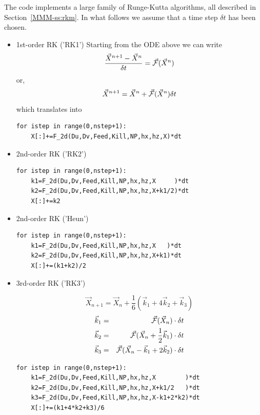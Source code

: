 The code implements a large family of Runge-Kutta algorithms, all described in 
Section~\ref{MMM-ss:rkm}.
In what follows we assume that a time step $\delta t$ has been chosen. 

\begin{itemize}

\item 1st-order RK ('RK1')
Starting from the ODE above we can write
\[
\frac{\vec{X}^{n+1} -\vec{X}^{n} }{\delta t} = \vec{\cal F} (\vec{X}^n)
\]
or, 
\[
\vec{X}^{n+1}
=
\vec{X}^{n} + \vec{\cal F} (\vec{X}^n) \delta t
\]
which translates into
\begin{lstlisting}
for istep in range(0,nstep+1):
    X[:]+=F_2d(Du,Dv,Feed,Kill,NP,hx,hz,X)*dt
\end{lstlisting}

\item 2nd-order RK ('RK2')
\begin{lstlisting}
for istep in range(0,nstep+1):
    k1=F_2d(Du,Dv,Feed,Kill,NP,hx,hz,X     )*dt
    k2=F_2d(Du,Dv,Feed,Kill,NP,hx,hz,X+k1/2)*dt
    X[:]+=k2
\end{lstlisting}

\item 2nd-order RK ('Heun')

\begin{lstlisting}
for istep in range(0,nstep+1):
    k1=F_2d(Du,Dv,Feed,Kill,NP,hx,hz,X   )*dt
    k2=F_2d(Du,Dv,Feed,Kill,NP,hx,hz,X+k1)*dt
    X[:]+=(k1+k2)/2
\end{lstlisting}



\item 3rd-order RK ('RK3')

\[
\vec{X}_{n+1} = \vec{X}_n + 
\frac{1}{6}\left(\vec{k}_1 + 4\vec{k}_2 + \vec{k}_3 \right)
\]
\begin{eqnarray}
\vec{k}_1 &=& \vec{\cal F}(\vec{X}_n) \cdot \delta t\nonumber\\
\vec{k}_2 &=& \vec{\cal F}(\vec{X}_n+ \frac{1}{2} \vec{k}_1) \cdot \delta t \nonumber\\
\vec{k}_3 &=& \vec{\cal F}(\vec{X}_n -\vec{k}_1 +2\vec{k}_2) \cdot \delta t \nonumber\\
\end{eqnarray}

\begin{lstlisting}
for istep in range(0,nstep+1):
    k1=F_2d(Du,Dv,Feed,Kill,NP,hx,hz,X        )*dt
    k2=F_2d(Du,Dv,Feed,Kill,NP,hx,hz,X+k1/2   )*dt
    k3=F_2d(Du,Dv,Feed,Kill,NP,hx,hz,X-k1+2*k2)*dt
    X[:]+=(k1+4*k2+k3)/6
\end{lstlisting}



\end{itemize}
